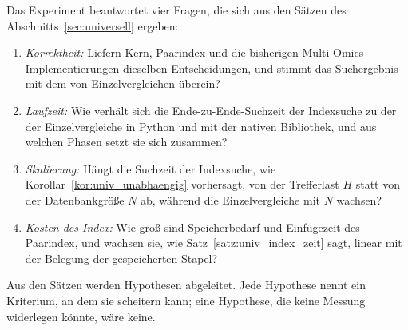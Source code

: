 Das Experiment beantwortet vier Fragen, die sich aus den Sätzen des Abschnitts~\ref{sec:universell} ergeben:
\begin{enumerate}[label=(\arabic*)]
	\item \emph{Korrektheit:} Liefern Kern, Paarindex und die bisherigen Multi-Omics-Implementierungen dieselben Entscheidungen, und stimmt das Suchergebnis mit dem von Einzelvergleichen überein?
	\item \emph{Laufzeit:} Wie verhält sich die Ende-zu-Ende-Suchzeit der Indexsuche zu der der Einzelvergleiche in Python und mit der nativen Bibliothek, und aus welchen Phasen setzt sie sich zusammen?
	\item \emph{Skalierung:} Hängt die Suchzeit der Indexsuche, wie Korollar~\ref{kor:univ_unabhaengig} vorhersagt, von der Trefferlast $H$ statt von der Datenbankgröße $N$ ab, während die Einzelvergleiche mit $N$ wachsen?
	\item \emph{Kosten des Index:} Wie groß sind Speicherbedarf und Einfügezeit des Paarindex, und wachsen sie, wie Satz~\ref{satz:univ_index_zeit} sagt, linear mit der Belegung der gespeicherten Stapel?
\end{enumerate}

Aus den Sätzen werden Hypothesen abgeleitet. Jede Hypothese nennt ein Kriterium, an dem sie scheitern kann; eine Hypothese, die keine Messung widerlegen könnte, wäre keine.

